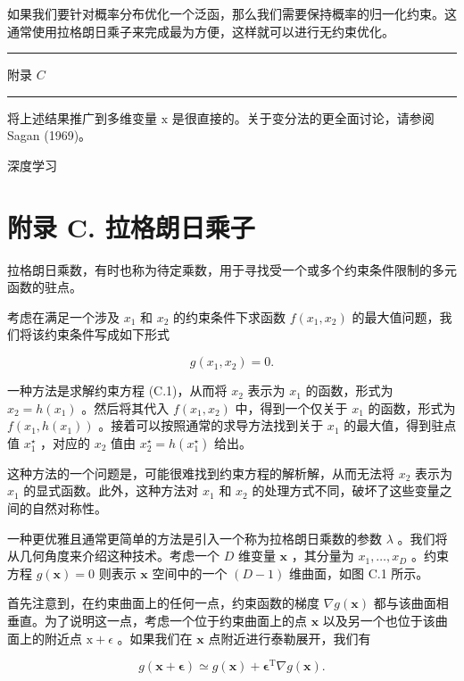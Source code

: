 \documentclass[10pt]{article}
\newcommand{\HRule}{\begin{center}\rule{0.9\linewidth}{0.2mm}\end{center}}
\begin{document}
如果我们要针对概率分布优化一个泛函，那么我们需要保持概率的归一化约束。这通常使用拉格朗日乘子来完成最为方便，这样就可以进行无约束优化。

\HRule

附录 \(C\)

\HRule

将上述结果推广到多维变量 \(\mathrm{x}\) 是很直接的。关于变分法的更全面讨论，请参阅 Sagan (1969)。

深度学习

\section*{附录 C. 拉格朗日乘子}

拉格朗日乘数，有时也称为待定乘数，用于寻找受一个或多个约束条件限制的多元函数的驻点。

考虑在满足一个涉及 \({x}_{1}\) 和 \({x}_{2}\) 的约束条件下求函数 \(f\left( {{x}_{1},{x}_{2}}\right)\) 的最大值问题，我们将该约束条件写成如下形式

\[
g\left( {{x}_{1},{x}_{2}}\right)  = 0. \tag{C.1}
\]

一种方法是求解约束方程 (C.1)，从而将 \({x}_{2}\) 表示为 \({x}_{1}\) 的函数，形式为 \({x}_{2} = h\left( {x}_{1}\right)\) 。然后将其代入 \(f\left( {{x}_{1},{x}_{2}}\right)\) 中，得到一个仅关于 \({x}_{1}\) 的函数，形式为 \(f\left( {{x}_{1},h\left( {x}_{1}\right) }\right)\) 。接着可以按照通常的求导方法找到关于 \({x}_{1}\) 的最大值，得到驻点值 \({x}_{1}^{ \star  }\) ，对应的 \({x}_{2}\) 值由 \({x}_{2}^{ \star  } = h\left( {x}_{1}^{ \star  }\right)\) 给出。

这种方法的一个问题是，可能很难找到约束方程的解析解，从而无法将 \({x}_{2}\) 表示为 \({x}_{1}\) 的显式函数。此外，这种方法对 \({x}_{1}\) 和 \({x}_{2}\) 的处理方式不同，破坏了这些变量之间的自然对称性。

一种更优雅且通常更简单的方法是引入一个称为拉格朗日乘数的参数 \(\lambda\) 。我们将从几何角度来介绍这种技术。考虑一个 \(D\) 维变量 \(\mathbf{x}\) ，其分量为 \({x}_{1},\ldots ,{x}_{D}\) 。约束方程 \(g\left( \mathbf{x}\right)  = 0\) 则表示 \(\mathbf{x}\) 空间中的一个 \(\left( {D - 1}\right)\) 维曲面，如图 C.1 所示。

首先注意到，在约束曲面上的任何一点，约束函数的梯度 \(\nabla g\left( \mathbf{x}\right)\) 都与该曲面相垂直。为了说明这一点，考虑一个位于约束曲面上的点 \(\mathbf{x}\) 以及另一个也位于该曲面上的附近点 \(\mathrm{x} + \epsilon\) 。如果我们在 \(\mathbf{x}\) 点附近进行泰勒展开，我们有

\[
g\left( {\mathbf{x} + \mathbf{\epsilon }}\right)  \simeq  g\left( \mathbf{x}\right)  + {\mathbf{\epsilon }}^{\mathrm{T}}\nabla g\left( \mathbf{x}\right) . \tag{C.2}
\]
\end{document}
